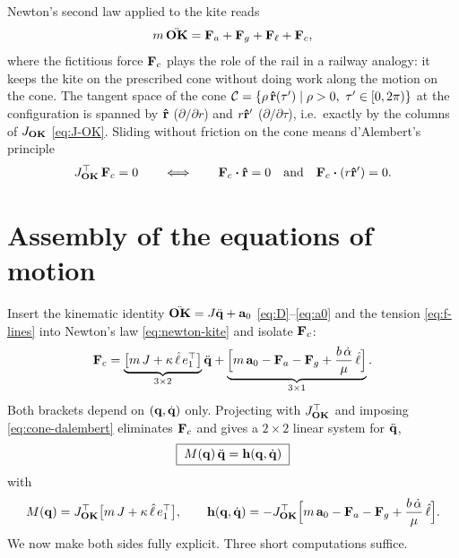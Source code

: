 \documentclass[10pt, a4paper]{article}
\begin{document}
Newton's second law applied to the kite reads
\begin{equation} \label{eq:newton-kite}
    m\,\ddot{\vb{OK}}
    = \vb F_a + \vb F_g + \vb F_\ell + \vb F_c ,
\end{equation}
where the fictitious force $\vb F_c$ plays the role of the rail in a
railway analogy: it keeps the kite on the prescribed cone without doing work
along the motion on the cone.  The tangent space of the cone
$\mathcal{C} = \{ \rho\,\vu r(\tau') \mid \rho > 0,\ \tau' \in [0, 2\pi) \}$ at
the configuration is spanned by $\vu r$ ($\partial/\partial r$) and
$r\vu r'$ ($\partial/\partial\tau$), i.e.\ exactly by the columns of
$J_{\vb{OK}}$ \eqref{eq:J-OK}.  Sliding without friction on the cone means
d'Alembert's principle
\begin{equation} \label{eq:cone-dalembert}
    J_{\OK}^\top\, \vb F_c = 0
    \qquad\Longleftrightarrow\qquad
    \vb F_c \vdot \rhat = 0
    \quad\text{and}\quad
    \vb F_c \vdot (r\rhat') = 0.
\end{equation}

\section{Assembly of the equations of motion}
\label{sec:assembly}

Insert the kinematic identity $\ddot{\vb{OK}} = J\ddot{\vb q} + \vb a_0$
\eqref{eq:D}--\eqref{eq:a0} and the tension \eqref{eq:f-lines} into
Newton's law \eqref{eq:newton-kite} and isolate $\vb F_c$:
\begin{equation} \label{eq:F_c}
    \vb F_c
    = \underbrace{\bigl[ m\,J + \kappa\,\hat \ell\, e_1^\top \bigr]}_{3\times 2}
    \ddot{\vb q}
    + \underbrace{\Bigl[ m\,\vb a_0 - \vb F_a - \vb F_g
    + \frac{b\,\dot\alpha}{\mu}\,\hat \ell \Bigr]}_{3\times 1}.
\end{equation}
Both brackets depend on $(\vb q, \dot{\vb q})$ only.  Projecting with
$J_{\vb{OK}}^\top$ and imposing \eqref{eq:cone-dalembert} eliminates $\vb F_c$
and gives a $2\times 2$ linear system for $\ddot{\vb q}$,
\begin{equation} \label{eq:eom-matrix}
    \boxed{\; M(\vb q)\,\ddot{\vb q} = \vb h(\vb q, \dot{\vb q}) \;}
\end{equation}
with
\begin{equation} \label{eq:M-h-def}
    M(\vb q)
    = J_{\vb{OK}}^\top \bigl[ m\,J + \kappa\,\hat \ell\, e_1^\top \bigr],
    \qquad
    \vb h(\vb q, \dot{\vb q})
    = -J_{\vb{OK}}^\top \Bigl[ m\,\vb a_0 - \vb F_a - \vb F_g
    + \frac{b\,\dot\alpha}{\mu}\,\hat \ell \Bigr].
\end{equation}
We now make both sides fully explicit.  Three short computations suffice.
\end{document}
